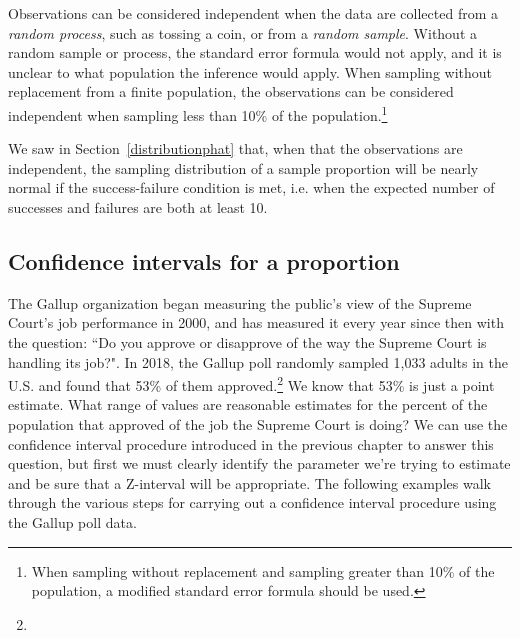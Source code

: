 \begin{description}
\setlength{\itemsep}{0mm}
\item[Independence.] Observations can be considered independent when the data are collected from a \emph{random process}, such as tossing a coin, or from a \emph{random sample}.  Without a random sample or process, the standard error formula would not apply, and it is unclear to what population the inference would apply.  When sampling without replacement from a finite population, the observations can be considered independent when sampling less than 10\% of the population.\footnote{When sampling without replacement and sampling greater than 10\% of the population, a modified standard error formula should be used.}
\item[Success-failure condition.] We saw in Section~\ref{distributionphat} that, when that the observations are independent, the sampling distribution of a sample proportion will be nearly normal if the success-failure condition is met, i.e. when the expected number of successes and failures are both at least 10.  
\end{description}


\D{\newpage}

\subsection{Confidence intervals for a proportion}
\label{confIntForPropSection}


The Gallup organization began measuring the public's view of the Supreme Court's job performance in 2000, and has measured it every year since then with the question: ``Do you approve or disapprove of the way the Supreme Court is handling its job?".  In 2018, the Gallup poll randomly sampled 1,033 adults in the U.S. and found that 53\% of them approved.\footnote{}  We know that 53\% is just a point estimate.  What range of values are reasonable estimates for the percent of the population that approved of the job the Supreme Court is doing?  We can use the confidence interval procedure introduced in the previous chapter to answer this question, but first we must clearly identify the parameter we're trying to estimate and be sure that a Z-interval will be appropriate.  The following examples walk through the various steps for carrying out a confidence interval procedure using the Gallup poll data.

